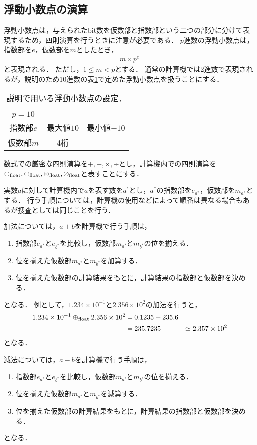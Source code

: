 \subsection{浮動小数点の演算}
浮動小数点は，与えられたbit数を仮数部と指数部という二つの部分に分けて表現するため，四則演算を行うときに注意が必要である．
$p$進数の浮動小数点は，指数部を$e$，仮数部を$m$としたとき，
\begin{align*}
    m \times p^e
\end{align*}
と表現される．
ただし，$1 \leq m < p$とする．
通常の計算機では2進数で表現されるが，説明のため10進数の表\ref{tab:float_setting}で定めた浮動小数点を扱うことにする．
\begin{table}[H]
    \centering
    \caption{説明で用いる浮動小数点の設定．}
    \begin{tabular}{ccc}
        \hline
        $p=10$ & & \\
        指数部$e$ & 最大値$10$ & 最小値$-10$ \\
        仮数部$m$ & 4桁 &
    \end{tabular}
    \label{tab:float_setting}
\end{table}

数式での厳密な四則演算を$+,-,\times,\div$とし，計算機内での四則演算を$\oplus_{\mathrm{float}},\ominus_{\mathrm{float}},\otimes_{\mathrm{float}},\oslash_{\mathrm{float}}$と表すことにする．

実数$a$に対して計算機内で$a$を表す数を$a^{\ast}$とし，$a^{\ast}$の指数部を$e_{a^{\ast}}$，仮数部を$m_{a^{\ast}}$とする．
行う手順については，計算機の使用などによって順番は異なる場合もあるが捜査としては同じことを行う．


加法については，$a + b$を計算機で行う手順は，
\begin{enumerate}
    \item 指数部$e_{a^{\ast}}$と$e_{b^{\ast}}$を比較し，仮数部$m_{a^{\ast}}$と$m_{b^{\ast}}$の位を揃える．
    \item 位を揃えた仮数部$m_{a^{\ast}}$と$m_{b^{\ast}}$を加算する．
    \item 位を揃えた仮数部の計算結果をもとに，計算結果の指数部と仮数部を決める．
\end{enumerate}
となる．
例として，$1.234 \times 10^{-1}$と$2.356 \times 10^{2}$の加法を行うと，
\begin{align*}
    1.234 \times 10^{-1} \oplus_{\mathrm{float}} 2.356 \times 10^{2} &= 0.1235 + 235.6 \\
    &= 235.7235 
    &\simeq 2.357 \times 10^{2}
\end{align*}
となる．

減法については，$a - b$を計算機で行う手順は，
\begin{enumerate}
    \item 指数部$e_{a^{\ast}}$と$e_{b^{\ast}}$を比較し，仮数部$m_{a^{\ast}}$と$m_{b^{\ast}}$の位を揃える．
    \item 位を揃えた仮数部$m_{a^{\ast}}$と$m_{b^{\ast}}$を減算する．
    \item 位を揃えた仮数部の計算結果をもとに，計算結果の指数部と仮数部を決める．
\end{enumerate}
となる．

